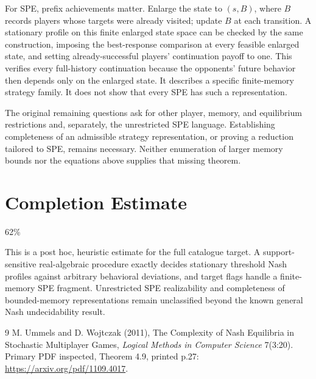 \documentclass[11pt]{article}
\begin{document}
For SPE, prefix achievements matter. Enlarge the state to $(s,B)$, where $B$ records players whose targets were already visited; update $B$ at each transition. A stationary profile on this finite enlarged state space can be checked by the same construction, imposing the best-response comparison at every feasible enlarged state, and setting already-successful players' continuation payoff to one. This verifies every full-history continuation because the opponents' future behavior then depends only on the enlarged state. It describes a specific finite-memory strategy family. It does not show that every SPE has such a representation.

The original remaining questions ask for other player, memory, and equilibrium restrictions and, separately, the unrestricted SPE language. Establishing completeness of an admissible strategy representation, or proving a reduction tailored to SPE, remains necessary. Neither enumeration of larger memory bounds nor the equations above supplies that missing theorem.

\section{Completion Estimate}
62\%

This is a post hoc, heuristic estimate for the full catalogue target.
A support-sensitive real-algebraic procedure exactly decides stationary threshold Nash profiles against arbitrary behavioral deviations, and target flags handle a finite-memory SPE fragment. Unrestricted SPE realizability and completeness of bounded-memory representations remain unclassified beyond the known general Nash undecidability result.

\begin{thebibliography}{9}
 M. Ummels and D. Wojtczak (2011), The Complexity of Nash Equilibria in Stochastic Multiplayer Games, \emph{Logical Methods in Computer Science} 7(3:20). Primary PDF inspected, Theorem 4.9, printed p.27: \url{https://arxiv.org/pdf/1109.4017}.
\end{thebibliography}
\end{document}
